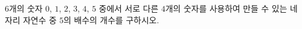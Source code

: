 $6$개의 숫자 $0$, $1$, $2$, $3$, $4$, $5$ 중에서 서로 다른 $4$개의 숫자를 사용하여 만들 수 있는 네 자리 자연수 중 $5$의 배수의 개수를 구하시오.
